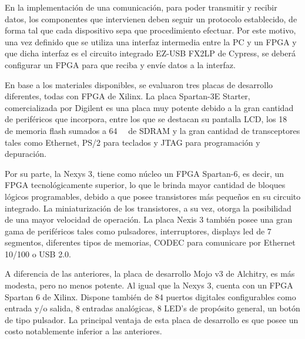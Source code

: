 
En la implementación de una comunicación, para poder transmitir y recibir datos, los componentes que intervienen deben seguir un protocolo establecido, de forma tal que cada dispositivo sepa que procedimiento efectuar. Por este motivo, una vez definido que se utiliza una interfaz intermedia entre la PC y un FPGA y que dicha interfaz es el circuito integrado EZ-USB FX2LP de Cypress, se deberá configurar un FPGA para que reciba y envíe datos a la interfaz.

En base a los materiales disponibles, se evaluaron tres placas de desarrollo diferentes, todas con FPGA de Xilinx. La placa Spartan-3E Starter, comercializada por Digilent es una placa muy potente debido a la gran cantidad de periféricos que incorpora, entre los que se destacan su pantalla LCD, los \SI{18}{\mega\byte} de memoria flash sumados a \SI{64}{\mega\byte} de SDRAM y la gran cantidad de transceptores tales como Ethernet, PS/2 para teclados y JTAG para programación y depuración.

Por su parte, la Nexys 3, tiene como núcleo un FPGA Spartan-6, es decir, un FPGA tecnológicamente superior, lo que le brinda mayor cantidad de bloques lógicos programables, debido a que posee transistores más pequeños en su circuito integrado. La miniaturización de los transistores, a su vez, otorga la posibilidad de una mayor velocidad de operación. La placa Nexis 3 también posee una gran gama de periféricos tales como pulsadores, interruptores, displays led de 7 segmentos, diferentes tipos de memorias, CODEC para comunicare por Ethernet 10/100 o USB 2.0.

A diferencia de las anteriores, la placa de desarrollo Mojo v3 de Alchitry, es más modesta, pero no menos potente. Al igual que la Nexys 3, cuenta con un FPGA Spartan 6 de Xilinx. Dispone también de 84 puertos digitales configurables como entrada y/o salida, 8 entradas analógicas, 8 LED's de propósito general, un botón de tipo pulsador. La principal ventaja de esta placa de desarrollo es que posee un costo notablemente inferior a las anteriores.


